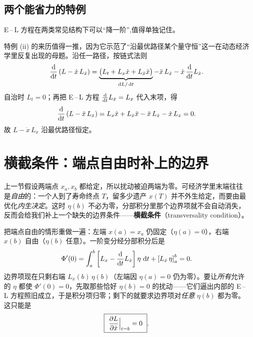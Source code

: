 \subsection{两个能省力的特例}

E\,–\,L 方程在两类常见结构下可以``降一阶'',值得单独记住。


特例 (ii) 的来历值得一推，因为它示范了``沿最优路径某个量守恒''这一在动态经济学里反复出现的母题。沿任一路径，按链式法则
\[
    \frac{\mathop{}\!\mathrm{d} }{\mathop{}\!\mathrm{d} t}\left(L-\dot x\,L_{\dot x}\right)
    =\underbrace{\bigl(L_t+L_x\dot x+L_{\dot x}\ddot x\bigr)}_{\mathop{}\!\mathrm{d} L/\mathop{}\!\mathrm{d} t}
    -\ddot x\,L_{\dot x}-\dot x\,\frac{\mathop{}\!\mathrm{d} }{\mathop{}\!\mathrm{d} t}L_{\dot x} .
\]
自治时 $L_t=0$；再把 E\,–\,L 方程 $\frac{\mathop{}\!\mathrm{d}}{\mathop{}\!\mathrm{d} t}L_{\dot x}=L_x$ 代入末项，得
\[
    \frac{\mathop{}\!\mathrm{d} }{\mathop{}\!\mathrm{d} t}\left(L-\dot x\,L_{\dot x}\right)
    =L_x\dot x+L_{\dot x}\ddot x-\ddot x\,L_{\dot x}-\dot x\,L_x=0 .
\]
故 $L-\dot x\,L_{\dot x}$ 沿最优路径恒定。


\section{横截条件：端点自由时补上的边界}
\label{sec:calcvar-3}

上一节假设两端点 $x_a,x_b$ 都给定，所以扰动被迫两端为零。可经济学里末端往往是\emph{自由}的：一个人到了寿命终点 $T$，留多少遗产 $x(T)$ 并不外生给定，而要由最优化\emph{内生决定}。这时 $\eta(b)$ 不必为零，分部积分里那个边界项就不会自动消失，反而会给我们补上一个缺失的边界条件——\textbf{横截条件}（transversality condition）。

把端点自由的情形重做一遍：左端 $x(a)=x_a$ 仍固定（$\eta(a)=0$），右端 $x(b)$ 自由（$\eta(b)$ 任意）。一阶变分经分部积分后是
\[
    \Phi'(0)=\int_a^b\left[L_x-\frac{\mathop{}\!\mathrm{d} }{\mathop{}\!\mathrm{d} t}L_{\dot x}\right]\eta\,\mathop{}\!\mathrm{d} t
    +\left[L_{\dot x}\,\eta\right]_a^b=0 .
\]
边界项现在只剩右端 $L_{\dot x}(b)\,\eta(b)$（左端因 $\eta(a)=0$ 仍为零）。要让\emph{所有}允许的 $\eta$ 都使 $\Phi'(0)=0$，先取那些恰好 $\eta(b)=0$ 的扰动——它们逼出内部的 E\,–\,L 方程照旧成立，于是积分项归零；剩下的就要求边界项对\emph{任意} $\eta(b)$ 都为零。这只能是
\[
    \boxed{\ \frac{\partial L}{\partial \dot x}\Big|_{t=b}=0\ } .
\]

